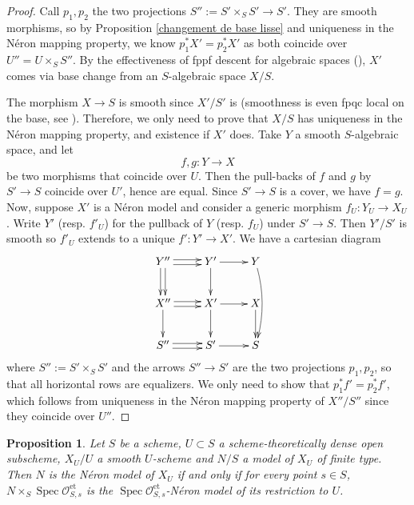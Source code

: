\documentclass[a4paper,10pt,twoside]{article}
\newcommand{\ra}{\rightarrow}
\newcommand{\on}[1]{\operatorname{#1}}
\renewcommand{\O}{\mathcal{O}}
\DeclareMathOperator{\spec}{Spec}
\newtheorem{prop}[thm]{Proposition}
\theoremstyle{definition}
\theoremstyle{remark}
\renewcommand{\on}[1]{\operatorname{#1}}
\begin{document}
\begin{proof}
Call $p_1,p_2$ the two projections $S'':=S'\times_S S'\ra S'$. They are smooth morphisms, so by Proposition \ref{changement de base lisse} and uniqueness in the Néron mapping property, we know $p_1^*X'=p_2^*X'$ as both coincide over $U''=U\times_S S''$. By the effectiveness of fppf descent for algebraic spaces (\cite[\href{https://stacks.math.columbia.edu/tag/0ADV}{Tag 0ADV}]{stacks-project}), $X'$ comes via base change from an $S$-algebraic space $X/S$.

The morphism $X\ra S$ is smooth since $X'/S'$ is (smoothness is even fpqc local on the base, see \cite[\href{http://stacks.math.columbia.edu/tag/02VL}{Tag 02VL}]{stacks-project}). Therefore, we only need to prove that $X/S$ has uniqueness in the Néron mapping property, and existence if $X'$ does. Take $Y$ a smooth $S$-algebraic space, and let
\[
f,g\colon Y \longrightarrow X
\]
be two morphisms that coincide over $U$. Then the pull-backs of $f$ and $g$ by $S' \to S$ coincide over $U'$, hence are equal. Since $S' \to S$ is a cover, we have $f=g$.
Now, suppose $X'$ is a Néron model and consider a generic morphism $f_U\colon Y_U\ra X_U$. Write $Y'$ (resp. $f'_U$) for the pullback of $Y$ (resp. $f_U$) under $S'\ra S$. Then $Y'/S'$ is smooth so $f'_U$ extends to a unique $f'\colon Y'\ra X'$. We have a cartesian diagram
\[
\xymatrix{
Y''\ar@<-.5ex>[d] \ar@<.5ex>[d] \ar@<-.5ex>[r] \ar@<.5ex>[r] &Y'\ar[d]\ar[r] &Y\ar@/^/[dd]\\
X''\ar[d] \ar@<-.5ex>[r] \ar@<.5ex>[r] &X'\ar[d]\ar[r] &X\ar[d]\\
S''\ar@<-.5ex>[r] \ar@<.5ex>[r] &S'\ar[r] &S
}
\]
where $S'':=S'\times_S S'$ and the arrows $S''\ra S'$ are the two projections $p_1,p_2$, so that all horizontal rows are equalizers. We only need to show that $p_1^*f'=p_2^*f'$, which follows from uniqueness in the N\'eron mapping property of $X''/S''$ since they coincide over $U''$.
\end{proof}



\begin{prop}\label{proposition on peut check qu'on est un NM sur les germes etales}
Let $S$ be a scheme, $U\subset S$ a scheme-theoretically dense open subscheme, $X_U/U$ a smooth $U$-scheme and $N/S$ a model of $X_U$ of finite type. Then $N$ is the N\'eron model of $X_U$ if and only if for every point $s\in S$, $N\times_S\spec\O_{S,s}^{\on{et}}$ is the $\spec\O_{S,s}^{\on{et}}$-N\'eron model of its restriction to $U$.
\end{prop}
\end{document}
